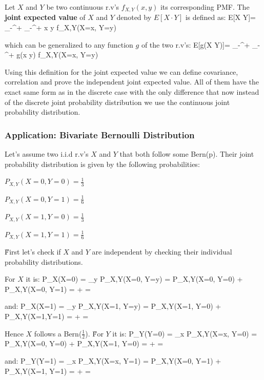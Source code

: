 Let $X$ and $Y$ be two continuous r.v's $f_{X,Y}(x,y)$ its corresponding PMF. The \textbf{joint expected value} of
$X$ and $Y$ denoted by $E[X \cdot Y]$ is defined as:
\bse
E[X \cdot Y]= \int_{-\infty}^{+\infty} \int_{-\infty}^{+\infty} x \cdot y \cdot f_{X,Y}(X=x, Y=y)
\ese
\ed

which can be generalized to any function $g$ of the two r.v's:
\bse
E[g(X \cdot Y)]= \int_{-\infty}^{+\infty} \int_{-\infty}^{+\infty} g(x \cdot y) \cdot f_{X,Y}(X=x, Y=y)
\ese

Using this definition for the joint expected value we can define covariance, correlation and prove the independent
joint expected value. All of them have the exact same form as in the discrete case with the only difference that now
instead of the discrete joint probability distribution we use the continuous joint probability distribution.

\subsubsection*{Application: Bivariate Bernoulli Distribution}

Let's assume two i.i.d r.v's $X$ and $Y$ that both follow some Bern(p). Their joint probability distribution is given
by the following probabilities:
\bit
\item $P_{X,Y}(X=0, Y=0) = \frac{1}{3}$
\item $P_{X,Y}(X=0, Y=1) = \frac{1}{6}$
\item $P_{X,Y}(X=1, Y=0) = \frac{1}{3}$
\item $P_{X,Y}(X=1, Y=1) = \frac{1}{6}$
\eit

\v

First let's check if $X$ and $Y$ are independent by checking their individual probability distributions.

For $X$ it is:
\bse
P_{X}(X=0) = \sum_{y} P_{X,Y}(X=0, Y=y) = P_{X,Y}(X=0, Y=0) + P_{X,Y}(X=0, Y=1) =  +  = 
\ese

and:
\bse
P_{X}(X=1) = \sum_{y} P_{X,Y}(X=1, Y=y) = P_{X,Y}(X=1, Y=0) + P_{X,Y}(X=1,Y=1) =  +  = 
\ese

Hence $X$ follows a Bern\Big($\frac{1}{2}$\Big). \v

For $Y$ it is:
\bse
P_{Y}(Y=0) = \sum_{x} P_{X,Y}(X=x, Y=0) = P_{X,Y}(X=0, Y=0) + P_{X,Y}(X=1, Y=0) =  +  = 
\ese

and:
\bse
P_{Y}(Y=1) = \sum_{x} P_{X,Y}(X=x, Y=1) = P_{X,Y}(X=0, Y=1) + P_{X,Y}(X=1, Y=1) =  +  = 
\ese

